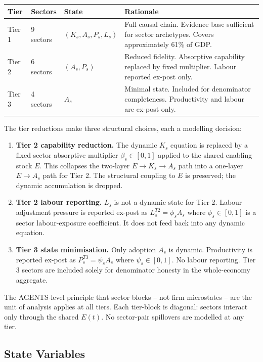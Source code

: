 \documentclass[11pt,a4paper]{article}
\begin{document}
\begin{center}
\begin{tabular}{lllp{5.5cm}}
\toprule
Tier & Sectors & State & Rationale \\
\midrule
Tier 1 & 9 sectors & $(K_s, A_s, P_s, L_s)$ & Full causal chain. Evidence base sufficient for sector archetypes. Covers approximately 61\% of GDP. \\
Tier 2 & 6 sectors & $(A_s, P_s)$ & Reduced fidelity. Absorptive capability replaced by fixed multiplier. Labour reported ex-post only. \\
Tier 3 & 4 sectors & $A_s$ & Minimal state. Included for denominator completeness. Productivity and labour are ex-post only. \\
\bottomrule
\end{tabular}
\end{center}

The tier reductions make three structural choices, each a modelling decision:
\begin{enumerate}[label=\arabic*.]
  \item \textbf{Tier 2 capability reduction.} The dynamic $K_s$ equation is replaced by a fixed sector absorptive multiplier $\beta_s \in [0,1]$ applied to the shared enabling stock $E$. This collapses the two-layer $E \to K_s \to A_s$ path into a one-layer $E \to A_s$ path for Tier 2. The structural coupling to $E$ is preserved; the dynamic accumulation is dropped.
  \item \textbf{Tier 2 labour reporting.} $L_s$ is not a dynamic state for Tier 2. Labour adjustment pressure is reported ex-post as $L_s^{T2} = \phi_s A_s$ where $\phi_s \in [0,1]$ is a sector labour-exposure coefficient. It does not feed back into any dynamic equation.
  \item \textbf{Tier 3 state minimisation.} Only adoption $A_s$ is dynamic. Productivity is reported ex-post as $P_s^{T3} = \psi_s A_s$ where $\psi_s \in [0,1]$. No labour reporting. Tier 3 sectors are included solely for denominator honesty in the whole-economy aggregate.
\end{enumerate}

The AGENTS-level principle that sector blocks -- not firm microstates -- are the unit of analysis applies at all tiers. Each tier-block is diagonal: sectors interact only through the shared $E(t)$. No sector-pair spillovers are modelled at any tier.

\subsection{State Variables}
\label{sec:statevars}
\end{document}
